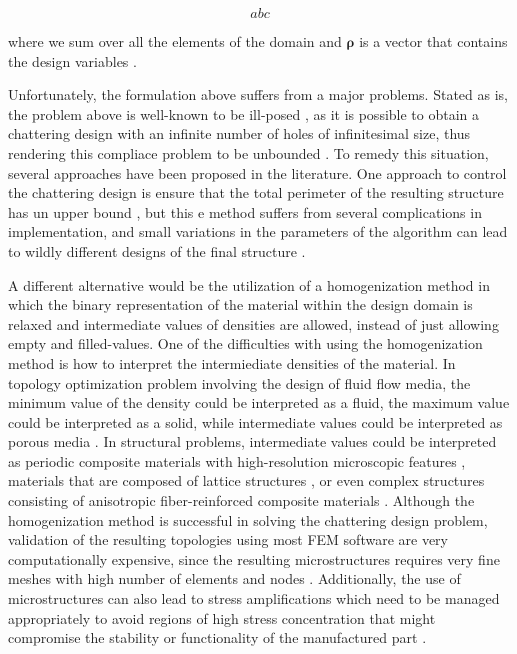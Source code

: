\documentclass[../main.tex]{subfiles}
\begin{document}
\begin{equation}
  abc
  \label{eq:stiffness}
\end{equation}

where we sum over all the elements of the domain and $\bm{\rho}$ is a vector that contains the design variables \cite{lazarovFiltersTopologyOptimization2011}. 

Unfortunately, the formulation above suffers from a major problems. Stated as is, the problem above is well-known to be ill-posed , as it is possible to obtain a chattering design with an infinite number of holes of infinitesimal size, thus rendering this compliace problem to be unbounded \cite{liuEfficient3DTopology2014}. To remedy this situation, several approaches have been proposed in the literature. One approach to control the chattering design is ensure that the total perimeter of the resulting structure has un upper bound \cite{haberNewApproachVariabletopology1996} \cite{Jog 2002}, but this e method suffers from several complications in implementation, and small variations in the parameters of the algorithm can lead to wildly different designs of the final structure \cite{Jog 2002}.

A different alternative would be the utilization of a homogenization method \cite{Bendsoe 1995, Allaire 2001} \cite{suzukiHomogenizationMethodShape1991} in which the binary representation of the material within the design domain is relaxed and intermediate values of densities are allowed, instead of just allowing empty and filled-values. One of the difficulties with using the homogenization method is how to interpret the intermiediate densities of the material. In topology optimization problem involving the design of fluid flow media, the minimum value of the density could be interpreted as a fluid, the maximum value could be interpreted as a solid, while intermediate values could be interpreted as porous media \cite{pietropaoliThreedimensionalFluidTopology2019}. In structural problems, intermediate values could be interpreted as periodic composite materials with high-resolution microscopic features \cite{groenHomogenizationbasedTopologyOptimization2018} \cite{alexandersenTopologyOptimisationManufacturable2015}, materials that are composed of lattice structures \cite{allaireTopologyOptimizationModulated2019}, or even complex structures consisting of anisotropic fiber-reinforced composite materials \cite{kimTopologyOptimizationFunctionally2020}. Although the homogenization method is successful in solving the chattering design problem, validation of the resulting topologies using most FEM software are very computationally expensive, since the resulting microstructures requires very fine meshes with high number of elements and nodes \cite{kimComputationalHomogenizationAdditively2022}. Additionally, the use of microstructures can also lead to stress amplifications which need to be managed appropriately to avoid regions of high stress concentration that might compromise the stability or functionality of the manufactured part \cite{allaireTopologyOptimizationMinimum2004}.
\end{document}
